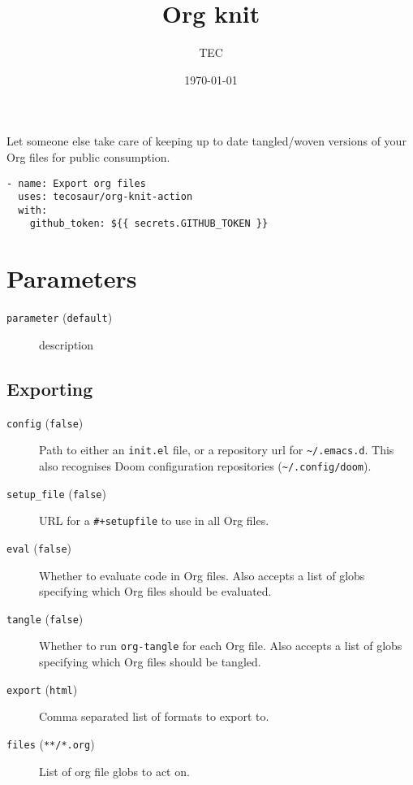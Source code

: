 \documentclass[11pt]{article}
\author{TEC}
\date{\today}
\title{Org knit}
\begin{document}
\maketitle
\tableofcontents

Let someone else take care of keeping up to date tangled/woven versions of your
Org files for public consumption.

\begin{verbatim}
- name: Export org files
  uses: tecosaur/org-knit-action
  with:
    github_token: ${{ secrets.GITHUB_TOKEN }}
\end{verbatim}

\section{Parameters}
\label{sec:org298163a}
\begin{description}
\item[{\texttt{parameter} (\texttt{default})}] description
\end{description}
\subsection{Exporting}
\label{sec:org2765774}
\begin{description}
\item[{\texttt{config} (\texttt{false})}] Path to either an \texttt{init.el} file, or a repository url for \texttt{\textasciitilde{}/.emacs.d}.
This also recognises Doom configuration repositories (\texttt{\textasciitilde{}/.config/doom}).
\item[{\texttt{setup\_file} (\texttt{false})}] URL for a \texttt{\#+setupfile} to use in all Org files.
\item[{\texttt{eval} (\texttt{false})}] Whether to evaluate code in Org files. Also accepts a list of
globs specifying which Org files should be evaluated.
\item[{\texttt{tangle} (\texttt{false})}] Whether to run \texttt{org-tangle} for each Org file. Also accepts a list of
globs specifying which Org files should be tangled.
\item[{\texttt{export} (\texttt{html})}] Comma separated list of formats to export to.
\item[{\texttt{files} (\texttt{**/*.org})}] List of org file globs to act on.
\end{description}
\end{document}
